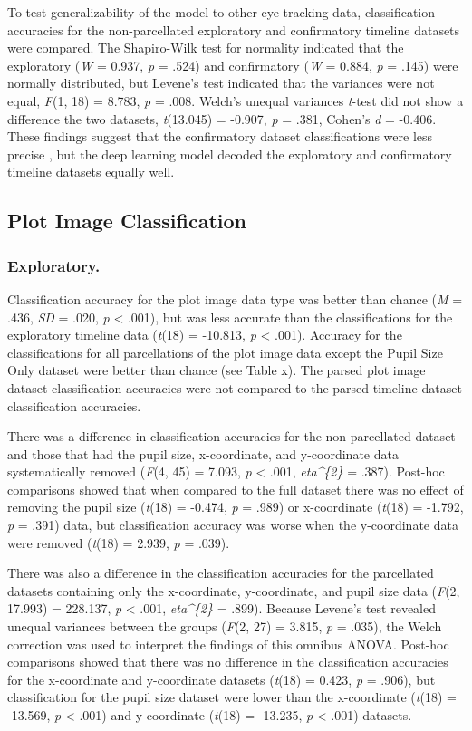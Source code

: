 \documentclass[
  english,
  man]{apa6}
\begin{document}
To test generalizability of the model to other eye tracking data, classification accuracies for the non-parcellated exploratory and confirmatory timeline datasets were compared. The Shapiro-Wilk test for normality indicated that the exploratory (\emph{W} = 0.937, \emph{p} = .524) and confirmatory (\emph{W} = 0.884, \emph{p} = .145) were normally distributed, but Levene's test indicated that the variances were not equal, \emph{F}(1, 18) = 8.783, \emph{p} = .008. Welch's unequal variances \emph{t}-test did not show a difference the two datasets, \emph{t}(13.045) = -0.907, \emph{p} = .381, Cohen's \emph{d} = -0.406. These findings suggest that the confirmatory dataset classifications were less precise , but the deep learning model decoded the exploratory and confirmatory timeline datasets equally well.

\subsection{Plot Image Classification}
\subsubsection{Exploratory.}

Classification accuracy for the plot image data type was better than chance (\emph{M} = .436, \emph{SD} = .020, \emph{p} \textless{} .001), but was less accurate than the classifications for the exploratory timeline data (\emph{t}(18) = -10.813, \emph{p} \textless{} .001). Accuracy for the classifications for all parcellations of the plot image data except the Pupil Size Only dataset were better than chance (see Table x). The parsed plot image dataset classification accuracies were not compared to the parsed timeline dataset classification accuracies.

There was a difference in classification accuracies for the non-parcellated dataset and those that had the pupil size, x-coordinate, and y-coordinate data systematically removed (\emph{F}(4, 45) = 7.093, \emph{p} \textless{} .001, \emph{eta\^{}\{2\}} = .387). Post-hoc comparisons showed that when compared to the full dataset there was no effect of removing the pupil size (\emph{t}(18) = -0.474, \emph{p} = .989) or x-coordinate (\emph{t}(18) = -1.792, \emph{p} = .391) data, but classification accuracy was worse when the y-coordinate data were removed (\emph{t}(18) = 2.939, \emph{p} = .039).

There was also a difference in the classification accuracies for the parcellated datasets containing only the x-coordinate, y-coordinate, and pupil size data (\emph{F}(2, 17.993) = 228.137, \emph{p} \textless{} .001, \emph{eta\^{}\{2\}} = .899). Because Levene's test revealed unequal variances between the groups (\emph{F}(2, 27) = 3.815, \emph{p} = .035), the Welch correction was used to interpret the findings of this omnibus ANOVA. Post-hoc comparisons showed that there was no difference in the classification accuracies for the x-coordinate and y-coordinate datasets (\emph{t}(18) = 0.423, \emph{p} = .906), but classification for the pupil size dataset were lower than the x-coordinate (\emph{t}(18) = -13.569, \emph{p} \textless{} .001) and y-coordinate (\emph{t}(18) = -13.235, \emph{p} \textless{} .001) datasets.
\end{document}
